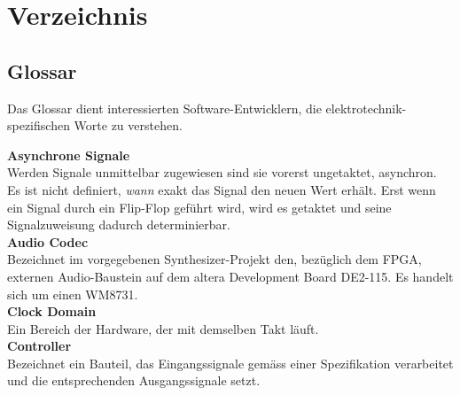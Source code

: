 
\chapter{Verzeichnis}\label{chap.verzeichnis}



\makeatletter
\renewcommand*\bib@heading{ \section{\refname}}
\makeatother



 


\section{Glossar}\label{sect.verzeichnis_glossar}
Das Glossar dient interessierten Software-Entwicklern, die elektrotechnik-spezifischen Worte zu verstehen.

\textbf{Asynchrone Signale}\\
Werden Signale unmittelbar zugewiesen sind sie vorerst ungetaktet, asynchron. Es ist nicht definiert, \textit{wann} exakt das Signal den neuen Wert erhält. Erst wenn ein Signal durch ein Flip-Flop geführt wird, wird es getaktet und seine Signalzuweisung dadurch determinierbar.\\

\textbf{Audio Codec}\\
Bezeichnet im vorgegebenen Synthesizer-Projekt den, bezüglich dem FPGA, externen Audio-Baustein auf dem altera Development Board DE2-115. Es handelt sich um einen WM8731.\\

\textbf{Clock Domain}\\
Ein Bereich der Hardware, der mit demselben Takt läuft.\\

\textbf{Controller}\\
Bezeichnet ein Bauteil, das Eingangssignale gemäss einer Spezifikation verarbeitet und die entsprechenden Ausgangssignale setzt.\\

